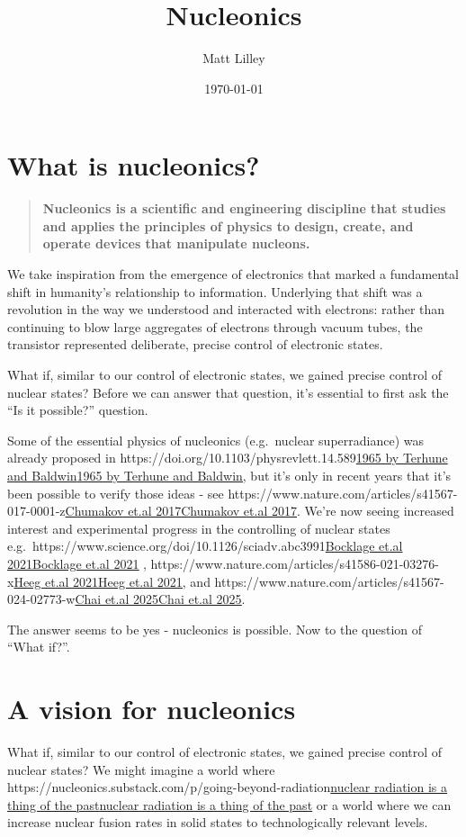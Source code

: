 \documentclass[
]{article}
\title{Nucleonics}
\author{Matt Lilley}
\date{\today}  %
\let\oldhref\href
\renewcommand{\href}[2]{\ifx#1\urlprefix\oldhref{#1}{#2}\else\uline{\oldhref{#1}{#2}}\fi}
\renewcommand{\[}{\begin{equation}}
\renewcommand{\]}{\end{equation}}
\begin{document}
\maketitle

\section{What is nucleonics?}\label{what-is-nucleonics}

\begin{quote}
\textbf{Nucleonics is a scientific and engineering discipline that
studies and applies the principles of physics to design, create, and
operate devices that manipulate nucleons.}
\end{quote}

We take inspiration from the emergence of electronics that marked a
fundamental shift in humanity's relationship to information. Underlying
that shift was a revolution in the way we understood and interacted with
electrons: rather than continuing to blow large aggregates of electrons
through vacuum tubes, the transistor represented deliberate, precise
control of electronic states.

What if, similar to our control of electronic states, we gained precise
control of nuclear states? Before we can answer that question, it's
essential to first ask the ``Is it possible?'' question.

Some of the essential physics of nucleonics (e.g.~nuclear superradiance)
was already proposed in
\href{https://doi.org/10.1103/physrevlett.14.589}{1965 by Terhune and
Baldwin}, but it's only in recent years that it's been possible to
verify those ideas - see
\href{https://www.nature.com/articles/s41567-017-0001-z}{Chumakov et.al
2017}. We're now seeing increased interest and experimental progress in
the controlling of nuclear states
e.g.~\href{https://www.science.org/doi/10.1126/sciadv.abc3991}{Bocklage
et.al 2021} ,
\href{https://www.nature.com/articles/s41586-021-03276-x}{Heeg et.al
2021}, and
\href{https://www.nature.com/articles/s41567-024-02773-w}{Chai et.al
2025}.

The answer seems to be yes - nucleonics is possible. Now to the question
of ``What if?''.

\section{A vision for nucleonics}\label{a-vision-for-nucleonics}

What if, similar to our control of electronic states, we gained precise
control of nuclear states? We might imagine a world where
\href{https://nucleonics.substack.com/p/going-beyond-radiation}{nuclear
radiation is a thing of the past} or a world where we can increase
nuclear fusion rates in solid states to technologically relevant levels.
\end{document}
